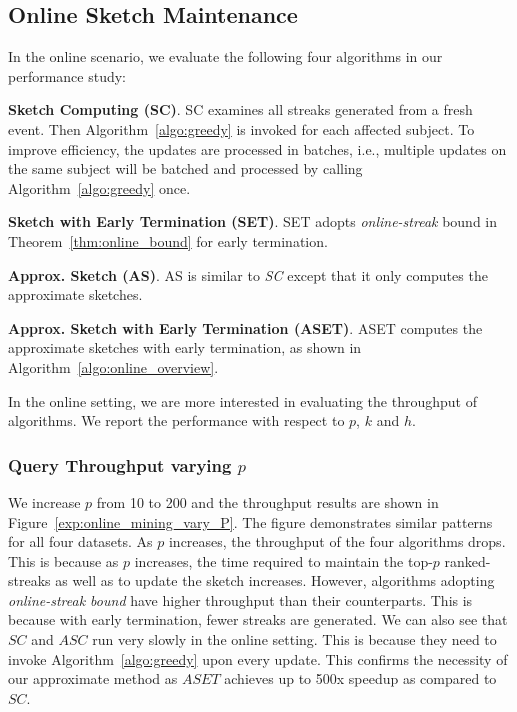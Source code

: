 \subsection{Online Sketch Maintenance}
\label{subsec:exp-online}
In the online scenario, we evaluate the following four algorithms in our performance study:


\noindent\textbf{Sketch Computing (SC)}. SC examines all streaks generated from a fresh event.
Then Algorithm~\ref{algo:greedy} is invoked for each affected subject.
To improve efficiency, the updates are processed in batches, i.e., multiple updates on the same subject will be batched and processed by calling Algorithm~\ref{algo:greedy} once.

\noindent\textbf{Sketch with Early Termination (SET)}. SET adopts \emph{online-streak} bound in Theorem~\ref{thm:online_bound} for early termination.

\noindent\textbf{Approx. Sketch (AS)}. AS is similar to \emph{SC} except that it only computes the approximate sketches. 

\noindent\textbf{Approx. Sketch with Early Termination (ASET)}. ASET computes the approximate sketches with early termination, as shown in Algorithm~\ref{algo:online_overview}.

In the online setting, we are more interested in evaluating the throughput of algorithms. We report the performance with respect to $p$, $k$ and $h$.

\subsubsection{Query Throughput varying $p$}
We increase $p$ from 10 to 200 and the throughput results are 
shown in Figure~\ref{exp:online_mining_vary_P}.
The figure demonstrates similar patterns for all four datasets. As $p$ increases, 
the throughput of the four algorithms drops.
This is because as $p$ increases, the time required to maintain the top-$p$ ranked-streaks
as well as to update the sketch increases.
However, algorithms adopting 
\emph{online-streak bound} have higher throughput than their counterparts. 
This is because with early termination,
fewer streaks are generated. 
We can also see that $SC$ and $ASC$ run very slowly in the online setting. 
This is because they need to invoke Algorithm~\ref{algo:greedy} upon every update.
This confirms the necessity of our approximate method as $ASET$ achieves up to 500x speedup as compared to $SC$.

